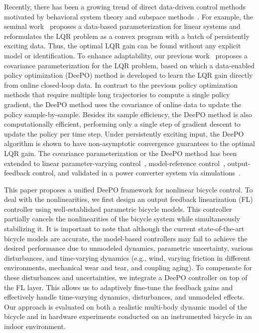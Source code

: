 Recently, there has been a growing trend of direct data-driven control methods motivated by behavioral system theory and subspace methods~\cite{willems2005note,de2019formulas, Coulson2019, berberich2020data,FlorianReg2022, van2020data}. For example, the seminal work~\cite{de2019formulas} proposes a data-based parameterization for linear systems and reformulates the LQR problem as a convex program with a batch of persistently exciting data. Thus, the optimal LQR gain can be found without any explicit model or identification.  To enhance adaptability, our previous work~\cite{zhao2023data, zhao2024data} proposes a covariance parameterization for the LQR problem, based on which a data-enabled policy optimization (DeePO) method is developed to learn the LQR gain directly from online closed-loop data. In contrast to the previous policy optimization methods \cite{choi2019toward, chung2017, weyrer2024path} that require multiple long trajectories to compute a single policy gradient, the DeePO method uses the covariance of online data to update the policy sample-by-sample. Besides its sample efficiency, the DeePO method is also computationally efficient, performing only a single step of gradient descent to update the policy per time step. Under persistently exciting input, the DeePO algorithm is shown to have non-asymptotic convergence guarantees to the optimal LQR gain. The covariance parameterization or the DeePO method has been extended to linear parameter-varying control~\cite{mejari2024direct}, model-reference control~\cite{mejari2024bias}, output-feedback control, and validated in a power converter system via simulations~\cite{zhao2024direct}.

This paper proposes a unified DeePO framework for nonlinear bicycle control. To deal with the nonlinearities, we first design an output feedback linearization (FL) controller using well-established parametric bicycle models. This controller partially cancels the nonlinearities of the bicycle system while simultaneously stabilizing it. It is important to note that although the current state-of-the-art bicycle models are accurate, the model-based controllers may fail to achieve the desired performance due to unmodeled dynamics, parametric uncertainty, various disturbances, and time-varying dynamics (e.g., wind, varying friction in different environments, mechanical wear and tear, and coupling aging). To compensate for these disturbances and uncertainties, we integrate a DeePO controller on top of the FL layer. This allows us to adaptively fine-tune the feedback gains and effectively handle time-varying dynamics, disturbances, and unmodeled effects. Our approach is evaluated on both a realistic multi-body dynamic model of the bicycle and in hardware experiments conducted on an instrumented bicycle in an indoor environment. 

